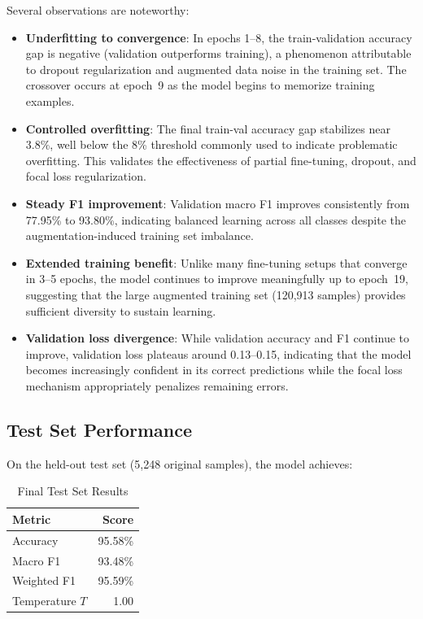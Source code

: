 \documentclass[conference, 10pt]{IEEEtran}
\begin{document}
Several observations are noteworthy:

\begin{itemize}[noitemsep]
    \item \textbf{Underfitting to convergence}: In epochs 1--8, the train-validation accuracy gap is negative (validation outperforms training), a phenomenon attributable to dropout regularization and augmented data noise in the training set. The crossover occurs at epoch~9 as the model begins to memorize training examples.
    \item \textbf{Controlled overfitting}: The final train-val accuracy gap stabilizes near 3.8\%, well below the 8\% threshold commonly used to indicate problematic overfitting. This validates the effectiveness of partial fine-tuning, dropout, and focal loss regularization.
    \item \textbf{Steady F1 improvement}: Validation macro F1 improves consistently from 77.95\% to 93.80\%, indicating balanced learning across all classes despite the augmentation-induced training set imbalance.
    \item \textbf{Extended training benefit}: Unlike many fine-tuning setups that converge in 3--5 epochs, the model continues to improve meaningfully up to epoch~19, suggesting that the large augmented training set (120,913 samples) provides sufficient diversity to sustain learning.
    \item \textbf{Validation loss divergence}: While validation accuracy and F1 continue to improve, validation loss plateaus around 0.13--0.15, indicating that the model becomes increasingly confident in its correct predictions while the focal loss mechanism appropriately penalizes remaining errors.
\end{itemize}

\subsection{Test Set Performance}

On the held-out test set (5,248 original samples), the model achieves:

\begin{table}[H]
    \centering
    \caption{Final Test Set Results}
    \label{tab:test}
    \begin{tabular}{lr}
        \toprule
        \textbf{Metric} & \textbf{Score} \\
        \midrule
        Accuracy        & 95.58\% \\
        Macro F1        & 93.48\% \\
        Weighted F1     & 95.59\% \\
        Temperature $T$ & 1.00 \\
        \bottomrule
    \end{tabular}
\end{table}
\end{document}
